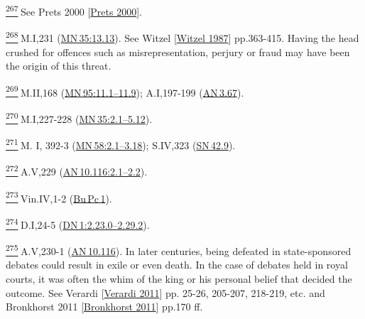 \label{footprints_split_024.html_fn267}
\hyperref[footprints_split_010.htmlux5cux23fnref267]{\textsuperscript{267}} See
{Prets 2000
{{[}\hyperref[footprints_split_022.htmlux5cux23Pretsux5cux25202000]{Prets
2000}{]}}}.

\label{footprints_split_024.html_fn268}
\hyperref[footprints_split_010.htmlux5cux23fnref268]{\textsuperscript{268}} M.I,231
(\href{https://suttacentral.net/mn35/en/sujato\#13.13}{MN\,35:13.13}).
See {Witzel
{{[}\hyperref[footprints_split_022.htmlux5cux23Witzelux5cux25201987]{Witzel
1987}{]}}} pp.363-415. Having the head crushed for offences such as
misrepresentation, perjury or fraud may have been the origin of this
threat.

\label{footprints_split_024.html_fn269}
\hyperref[footprints_split_010.htmlux5cux23fnref269]{\textsuperscript{269}} M.II,168
(\href{https://suttacentral.net/mn95/en/sujato\#11.1}{MN\,95:11.1--11.9});
A.I,197-199
(\href{https://suttacentral.net/an3.67/en/sujato}{AN\,3.67}).

\label{footprints_split_024.html_fn270}
\hyperref[footprints_split_010.htmlux5cux23fnref270]{\textsuperscript{270}} M.I,227-228
(\href{https://suttacentral.net/mn35/en/sujato\#2.1}{MN\,35:2.1--5.12}).

\label{footprints_split_024.html_fn271}
\hyperref[footprints_split_010.htmlux5cux23fnref271]{\textsuperscript{271}} M.
I, 392-3
(\href{https://suttacentral.net/mn58/en/sujato\#2.1}{MN\,58:2.1--3.18});
S.IV,323 (\href{https://suttacentral.net/sn42.9/en/sujato}{SN\,42.9}).

\label{footprints_split_024.html_fn272}
\hyperref[footprints_split_010.htmlux5cux23fnref272]{\textsuperscript{272}} A.V,229
(\href{https://suttacentral.net/an10.116/en/sujato\#2.1}{AN\,10.116:2.1--2.2}).

\label{footprints_split_024.html_fn273}
\hyperref[footprints_split_010.htmlux5cux23fnref273]{\textsuperscript{273}} Vin.IV,1-2
(\href{https://suttacentral.net/pli-tv-bu-vb-pc1/en/brahmali}{Bu\,Pc\,1}).

\label{footprints_split_024.html_fn274}
\hyperref[footprints_split_010.htmlux5cux23fnref274]{\textsuperscript{274}} D.I,24-5
(\href{https://suttacentral.net/dn1/en/sujato\#2.23.0}{DN\,1:2.23.0--2.29.2}).

\label{footprints_split_024.html_fn275}
\hyperref[footprints_split_010.htmlux5cux23fnref275]{\textsuperscript{275}} A.V,230-1
(\href{https://suttacentral.net/an10.116/en/sujato}{AN\,10.116}). In
later centuries, being defeated in state-sponsored debates could result
in exile or even death. In the case of debates held in royal courts, it
was often the whim of the king or his personal belief that decided the
outcome. See {Verardi
{{[}\hyperref[footprints_split_022.htmlux5cux23Verardiux5cux25202011]{Verardi
2011}{]}}} pp. 25-26, 205-207, 218-219, etc. and {Bronkhorst 2011
{{[}\hyperref[footprints_split_022.htmlux5cux23Bronkhorstux5cux25202011]{Bronkhorst
2011}{]}}} pp.170 ff.

